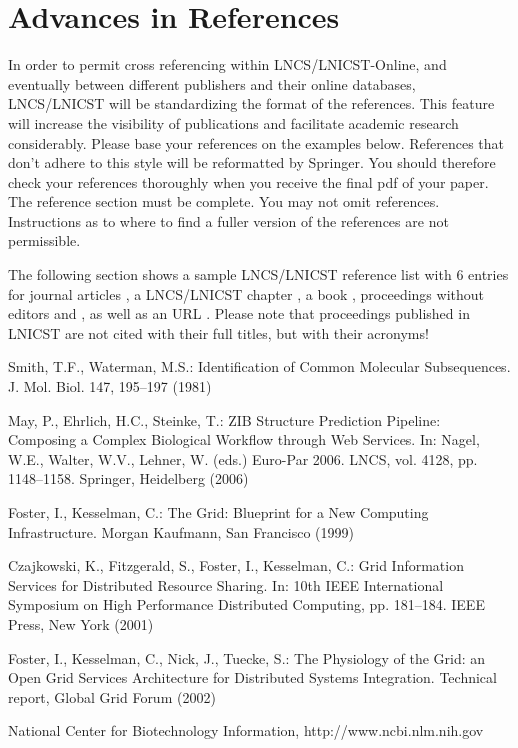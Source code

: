 \documentclass[lnicst,sechang,a4paper]{svmultln}
\begin{document}
\section{Advances in References}\label{references}

In order to permit cross referencing within LNCS/LNICST-Online, and eventually
between different publishers and their online databases, LNCS/LNICST will
be standardizing the format of the references. This
feature will increase the visibility of publications and facilitate
academic research considerably. Please base your references on the
examples below. References that don't adhere to this style will be
reformatted by Springer. You should therefore check your references
thoroughly when you receive the final pdf of your paper.
The reference section must be complete. You may not omit references.
Instructions as to where to find a fuller version of the references are
not permissible.

The following section shows a sample LNCS/LNICST reference list with 6 entries for
journal articles \cite{jour}, a LNCS/LNICST chapter \cite{lnicstchap}, a book
\cite{book}, proceedings without editors \cite{proceeding1} and
\cite{proceeding2}, as well as an URL \cite{url}.
Please note that proceedings published in LNICST are not cited with their
full titles, but with their acronyms!

\begin{thebibliography}{4}

 Smith, T.F., Waterman, M.S.: Identification of Common Molecular
Subsequences. J. Mol. Biol. 147, 195--197 (1981)

 May, P., Ehrlich, H.C., Steinke, T.: ZIB Structure Prediction Pipeline:
Composing a Complex Biological Workflow through Web Services. In: Nagel,
W.E., Walter, W.V., Lehner, W. (eds.) Euro-Par 2006. LNCS, vol. 4128,
pp. 1148--1158. Springer, Heidelberg (2006)

 Foster, I., Kesselman, C.: The Grid: Blueprint for a New Computing
Infrastructure. Morgan Kaufmann, San Francisco (1999)

 Czajkowski, K., Fitzgerald, S., Foster, I., Kesselman, C.: Grid
Information Services for Distributed Resource Sharing. In: 10th IEEE
International Symposium on High Performance Distributed Computing, pp.
181--184. IEEE Press, New York (2001)

 Foster, I., Kesselman, C., Nick, J., Tuecke, S.: The Physiology of the
Grid: an Open Grid Services Architecture for Distributed Systems
Integration. Technical report, Global Grid Forum (2002)

 National Center for Biotechnology Information, http://www.ncbi.nlm.nih.gov

\end{thebibliography}
\end{document}
